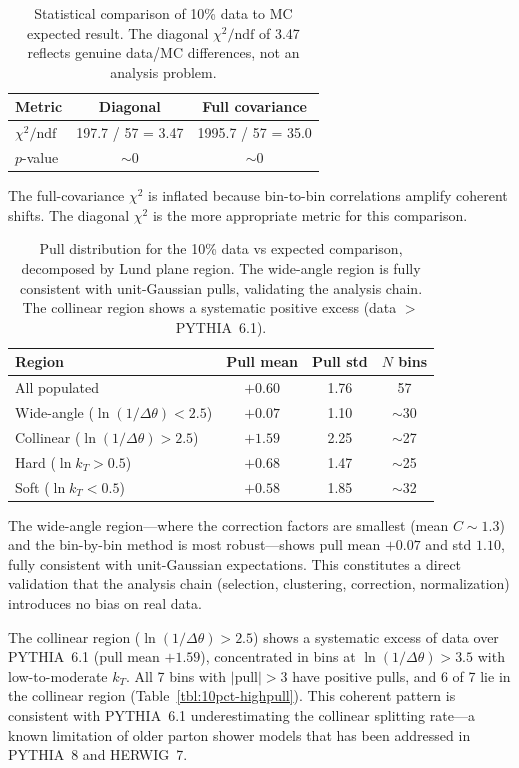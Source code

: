 \documentclass[11pt,a4paper]{article}
\begin{document}
\begin{table}[htbp]
\centering
\caption{Statistical comparison of 10\% data to MC expected result.
  The diagonal $\chi^2/\text{ndf}$ of 3.47 reflects genuine data/MC
  differences, not an analysis problem.}
\label{tbl:10pct-chi2}
\begin{tabular}{lcc}
\toprule
Metric & Diagonal & Full covariance \\
\midrule
$\chi^2/\text{ndf}$ & 197.7 / 57 = 3.47 & 1995.7 / 57 = 35.0 \\
$p$-value & $\sim 0$ & $\sim 0$ \\
\bottomrule
\end{tabular}
\end{table}

The full-covariance $\chi^2$ is inflated because bin-to-bin correlations
amplify coherent shifts.  The diagonal $\chi^2$ is the more appropriate
metric for this comparison.

\begin{table}[htbp]
\centering
\caption{Pull distribution for the 10\% data vs expected comparison,
  decomposed by Lund plane region.  The wide-angle region is fully
  consistent with unit-Gaussian pulls, validating the analysis chain.
  The collinear region shows a systematic positive excess (data
  $>$ PYTHIA~6.1).}
\label{tbl:10pct-pulls}
\begin{tabular}{lccc}
\toprule
Region & Pull mean & Pull std & $N$ bins \\
\midrule
All populated & $+0.60$ & 1.76 & 57 \\
Wide-angle ($\ln(1/\Delta\theta) < 2.5$) & $+0.07$ & 1.10 & $\sim$30 \\
Collinear ($\ln(1/\Delta\theta) > 2.5$) & $+1.59$ & 2.25 & $\sim$27 \\
Hard ($\ln k_T > 0.5$) & $+0.68$ & 1.47 & $\sim$25 \\
Soft ($\ln k_T < 0.5$) & $+0.58$ & 1.85 & $\sim$32 \\
\bottomrule
\end{tabular}
\end{table}

The wide-angle region---where the correction factors are smallest (mean
$C \sim 1.3$) and the bin-by-bin method is most robust---shows pull
mean $+0.07$ and std $1.10$, fully consistent with unit-Gaussian
expectations.  This constitutes a direct validation that the analysis
chain (selection, clustering, correction, normalization) introduces no
bias on real data.

The collinear region ($\ln(1/\Delta\theta) > 2.5$) shows a systematic
excess of data over PYTHIA~6.1 (pull mean $+1.59$), concentrated in
bins at $\ln(1/\Delta\theta) > 3.5$ with low-to-moderate $k_T$.  All 7
bins with $|\text{pull}| > 3$ have positive pulls, and 6 of 7 lie in
the collinear region (Table~\ref{tbl:10pct-highpull}).  This coherent
pattern is consistent with PYTHIA~6.1 underestimating the collinear
splitting rate---a known limitation of older parton shower models that
has been addressed in PYTHIA~8 and HERWIG~7.
\end{document}
